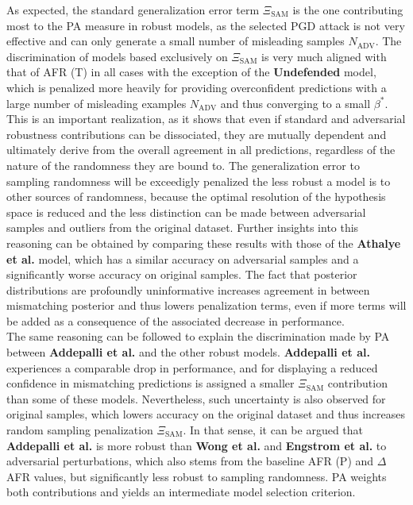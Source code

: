 As expected, the standard generalization error term $\Xi_{\text{SAM}}$ is the one contributing most to
the PA measure in robust models, as the selected PGD attack is not very effective and can only generate
a small number of misleading samples $N_{\text{ADV}}$. The discrimination of models based exclusively 
on $\Xi_{\text{SAM}}$  is very much aligned with that of AFR (T) in all cases with the exception of the
{\color{tab:orange} \textbf{Undefended}} model, which is penalized more heavily for providing
overconfident predictions with a large number of misleading examples $N_{\text{ADV}}$ and
thus converging to a small $\beta^{*}$. This is an important realization, as it shows that even if
standard and adversarial robustness contributions can be dissociated, they are mutually dependent
and ultimately derive from the overall agreement in all predictions, regardless of the nature of the
randomness they are bound to. The generalization error to sampling randomness will be exceedigly penalized
the less robust a model is to other sources of randomness, because the optimal resolution of the hypothesis
space is reduced and the less distinction can be made between adversarial samples and outliers from
the original dataset. Further insights into this reasoning can be obtained by comparing these results
with those of the {\color{tab:green} \textbf{Athalye et al.}} model, which has a similar accuracy
on adversarial samples and a significantly worse accuracy on original samples. The fact that posterior
distributions are profoundly uninformative increases agreement in between mismatching posterior and
thus lowers penalization terms, even if more terms will be added as a consequence of the
associated decrease in performance. \\

The same reasoning can be followed to explain the discrimination made by PA between
{\color{tab:purple} \textbf{Addepalli et al.}} and the other robust models. {\color{tab:purple} \textbf{Addepalli et al.}}
experiences a comparable drop in performance, and for displaying a reduced confidence in mismatching predictions
is assigned a smaller $\Xi_{\text{SAM}}$ contribution than some of these models. Nevertheless, such 
uncertainty is also observed for original samples, which lowers accuracy on the original dataset 
and thus increases random sampling penalization $\Xi_{\text{SAM}}$. In that sense, it can be argued
that {\color{tab:purple} \textbf{Addepalli et al.}} is more robust than {\color{tab:red} \textbf{Wong et al.}}
and {\color{tab:blue} \textbf{Engstrom et al.}} to adversarial perturbations, which also stems from
the baseline AFR (P) and $\Delta$AFR values, but significantly less robust to sampling randomness.
PA weights both contributions and yields an intermediate model selection criterion. \\

